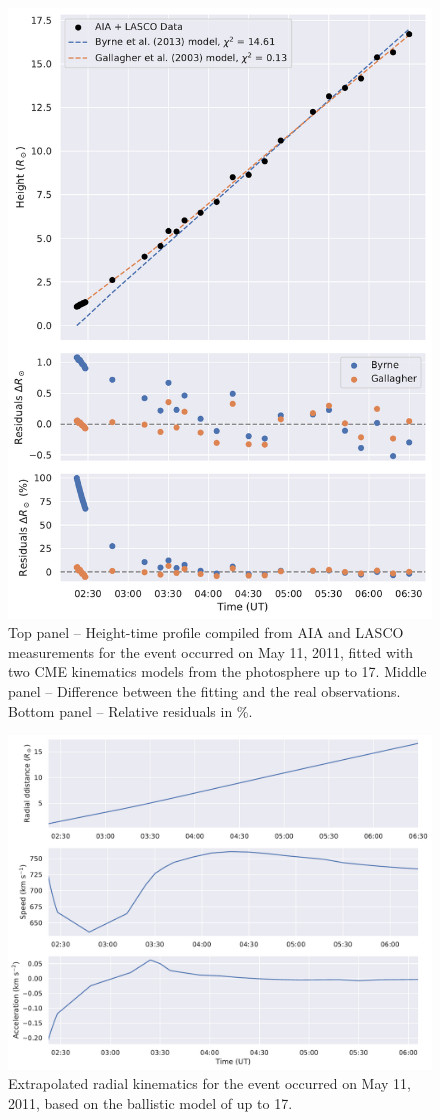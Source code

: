 \begin{figure}[!htp] %
	\centerline{\includegraphics[width=0.6\columnwidth]{chapter2/figs/height_profile_residuals_aia_lasco_110511_01.pdf}}
	\caption{Top panel -- Height-time profile compiled from AIA and LASCO measurements for the event occurred on May 11, 2011, fitted with two CME kinematics models from the photosphere up to 17\rsun. Middle panel -- Difference between the fitting and the real observations. Bottom panel -- Relative residuals in \%.}
	\label{fig_height_profile_aialasco_110511}
\end{figure}

\begin{figure}[!htp] %
	\centerline{\includegraphics[width=0.8\columnwidth]{chapter2/figs/radial_kinematics_aia_lasco_110511_01.pdf}}
	\caption{Extrapolated radial kinematics for the event occurred on May 11, 2011, based on the ballistic model of \cite{gallagher_2003} up to 17\rsun.}
	\label{fig_rad_kinematics_aialasco_110511}
\end{figure}

